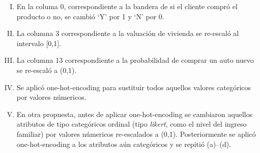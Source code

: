 \documentclass[letterpaper,11pt]{article}
\begin{document}
\begin{multicols}{2}
\begin{enumerate}[I.]
    \item En la columa 0, correspondiente a la bandera de si el cliente compró el producto o no, se cambió `Y' por 1
        y `N' por 0.
    \item La columna 3 correspondiente a la valuación de vivienda se re-escaló al intervalo [0,1]. 
    \item La columna 13 correspondiente a la probabilidad de comprar un auto nuevo se re-escaló a (0,1). 
    \item Se aplicó one-hot-encoding para sustituir todos aquellos valores categóricos por valores númericos. 
    \item En otra propuesta, antes de aplicar one-hot-encoding se cambiaron aquellos atributos de tipo categóricos
        ordinal (tipo \emph{likert}, como el nivel del ingreso familiar) por valores númericos re-escalados a (0,1).
        Posteriormente se aplicó one-hot-encoding a los atributos aún categóricos y se repitió (a)--(d).
\end{enumerate}
\end{multicols}
\end{document}
